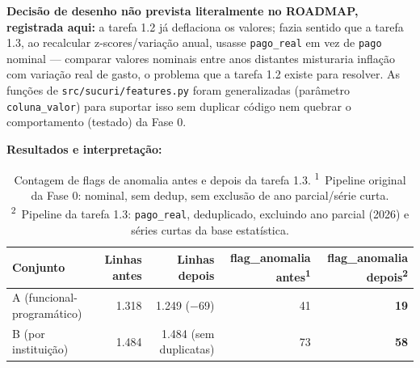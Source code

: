 \documentclass[11pt,a4paper]{article}
\begin{document}
\textbf{Decisão de desenho não prevista literalmente no ROADMAP, registrada
aqui:} a tarefa 1.2 já deflaciona os valores; fazia sentido que a tarefa
1.3, ao recalcular z-scores/variação anual, usasse \texttt{pago\_real} em
vez de \texttt{pago} nominal --- comparar valores nominais entre anos
distantes misturaria inflação com variação real de gasto, o problema que a
tarefa 1.2 existe para resolver. As funções de
\texttt{src/sucuri/features.py} foram generalizadas (parâmetro
\texttt{coluna\_valor}) para suportar isso sem duplicar código nem quebrar
o comportamento (testado) da Fase 0.

\textbf{Resultados e interpretação:}

\begin{table}[h]
\centering
\begin{tabular}{@{}lrrrr@{}}
\toprule
\textbf{Conjunto} & \textbf{Linhas antes} & \textbf{Linhas depois} & \textbf{flag\_anomalia antes\textsuperscript{1}} & \textbf{flag\_anomalia depois\textsuperscript{2}} \\
\midrule
A (funcional-programático) & 1.318 & 1.249 ($-$69) & 41 & \textbf{19} \\
B (por instituição) & 1.484 & 1.484 (sem duplicatas) & 73 & \textbf{58} \\
\bottomrule
\end{tabular}
\caption{Contagem de flags de anomalia antes e depois da tarefa 1.3.
\textsuperscript{1}~Pipeline original da Fase 0: nominal, sem dedup, sem
exclusão de ano parcial/série curta.
\textsuperscript{2}~Pipeline da tarefa 1.3: \texttt{pago\_real},
deduplicado, excluindo ano parcial (2026) e séries curtas da base
estatística.}
\end{table}
\end{document}
